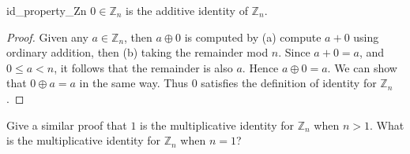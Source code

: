 \begin{prop}{id_property_Zn}
$0 \in {\mathbb Z}_n$ is the additive identity of ${\mathbb Z}_n$.
\end{prop}
\begin{proof} Given any $a \in {\mathbb Z}_n$, then $a \oplus 0$ is computed by (a) compute $a + 0$ using ordinary addition, then (b) taking the remainder mod $n$. Since $a + 0 = a$, and $0 \leq a < n$, it follows that the remainder is also $a$. Hence $a \oplus 0 = a $. We can show that $0 \oplus a = a $ in the same way. Thus $0$ satisfies the definition of identity for ${\mathbb Z}_n$.
\end{proof}

\begin{exercise}{56}
Give a similar proof that $1$ is the multiplicative identity for ${\mathbb Z}_n$ when $n >1$. What is the multiplicative identity for ${\mathbb Z}_n$ when $n=1$?
\end{exercise}







